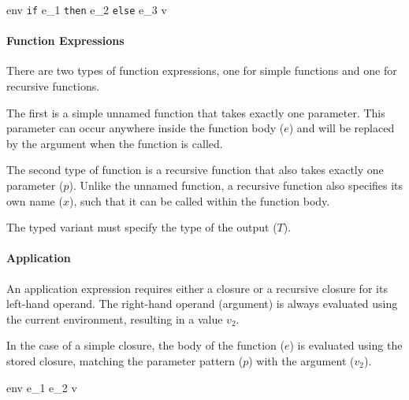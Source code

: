 \documentclass{article}
\begin{document}
    {\mbox{env} \vdash \texttt{if} \; e_1\; \texttt{then} \; e_2 \; \texttt{else} \; e_3 \Downarrow v}

\paragraph{Function Expressions}

There are two types of function expressions, one for simple functions and one for recursive functions.

\smallskip

The first is a simple unnamed function that takes exactly one parameter.
This parameter can occur anywhere inside the function body ($e$) and will be replaced by the argument when the function is called.


The second type of function is a recursive function that also takes exactly one parameter ($p$).
Unlike the unnamed function, a recursive function also specifies its own name ($x$), such that it can be called within the function body.

The typed variant must specify the type of the output ($T$).



\paragraph{Application}
An application expression requires either a closure or a recursive closure for its left-hand operand.
The right-hand operand (argument) is always evaluated using the current environment, resulting in a value $v_2$.

\smallskip

In the case of a simple closure, the body of the function ($e$) is evaluated using the stored closure, matching the parameter pattern ($p$) with the argument ($v_2$).

    {\mbox{env} \vdash e_1 \; e_2 \Downarrow v}
\end{document}
